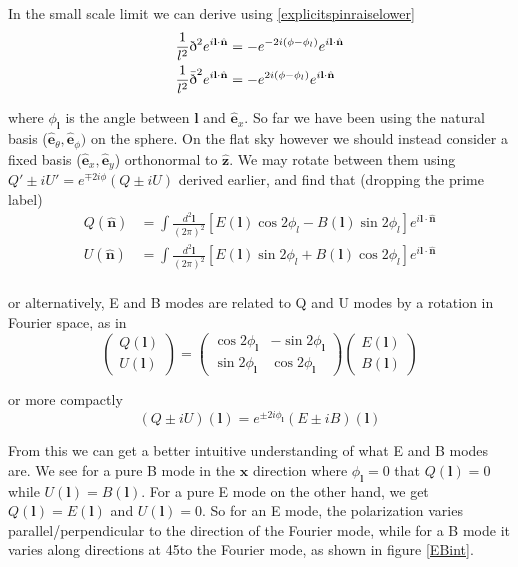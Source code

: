 \documentclass[a4paper,10pt]{article}
\renewcommand{\v}[1]{\mathbf{#1}}
\newcommand{\finttwo}[1]{\int \frac{d^2 \v{#1}}{(2\pi)^2}}
\newcommand{\unit}[1]{\hat{\v{#1}}}
\newcommand{\sr}{\text{\normalfont\dh}}
\renewcommand{\sl}{\bar{\text{\normalfont\dh}}}
\begin{document}
In the small scale limit we can derive using \ref{explicitspinraiselower}
\begin{equation}\begin{split}
\frac{1}{l^2}\sr^2e^{i\v{l}\cdot\unit{n}} &= -e^{-2i(\phi-\phi_l)}e^{i\v{l}\cdot\unit{n}}\\
\frac{1}{l^2}\sl^2e^{i\v{l}\cdot\unit{n}} &= -e^{2i(\phi-\phi_l)}e^{i\v{l}\cdot\unit{n}}
\end{split}\end{equation}

where $\phi_\v{l}$ is the angle between $\v{l}$ and $\unit{e}_x$. So far we have been using the natural basis ($\unit{e}_\theta, \unit{e}_\phi)$ on the sphere. On the flat sky however we should instead consider a fixed basis ($\unit{e}_x, \unit{e}_y$) orthonormal to $\unit{z}$. We may rotate between them using $Q'\pm iU' = e^{\mp 2i\phi}(Q\pm iU)$ derived earlier, and find that (dropping the prime label)
\begin{equation}\begin{split}
Q(\unit{n}) &= \finttwo{l} [E(\v{l})\cos{2\phi_l}-B(\v{l})\sin{2\phi_l}]  e^{i\v{l}\cdot\unit{n}}\\
U(\unit{n}) &= \finttwo{l} [E(\v{l})\sin{2\phi_l}+B(\v{l})\cos{2\phi_l}]  e^{i\v{l}\cdot\unit{n}}\\
\end{split}\end{equation}

or alternatively, E and B modes are related to Q and U modes by a rotation in Fourier space, as in \cite{baldauf}
\begin{equation}
\begin{pmatrix}
Q(\v{l})\\
U(\v{l}) 
\end{pmatrix}
=
\begin{pmatrix}
\cos{2\phi_\v{l}} & -\sin{2\phi_\v{l}}\\ 
\sin{2\phi_\v{l}} & \cos{2\phi_\v{l}}
\end{pmatrix}
\begin{pmatrix}
E(\v{l})\\
B(\v{l}) 
\end{pmatrix}
\end{equation}

or more compactly
\begin{equation}
(Q\pm iU)(\v{l}) = e^{\pm2i\phi_\v{l}}(E\pm iB)(\v{l})
\label{QUrotateflat}
\end{equation}

From this we can get a better intuitive understanding of what E and B modes are. We see for a pure B mode in the $\unit{x}$ direction where $\phi_\v{l} = 0$ that $Q(\v{l})=0$ while $U(\v{l})=B(\v{l})$. For a pure E mode on the other hand, we get  $Q(\v{l})=E(\v{l})$ and $U(\v{l})=0$. So for an E mode, the polarization varies parallel/perpendicular to the direction of the Fourier mode, while for a B mode it varies along directions at 45\textdegree to the Fourier mode, as shown in figure \ref{EBint}.
\end{document}
